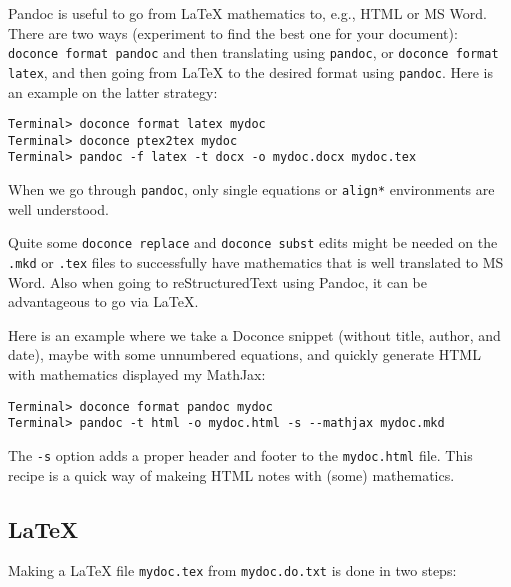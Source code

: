 \documentclass[%
oneside,                 %
final,                   %
10pt]{article}
\begin{document}
{{{{Pandoc is useful to go from {\LaTeX} mathematics to, e.g., HTML or MS Word.
There are two ways (experiment to find the best one for your document):
{\fontsize{10pt}{10pt}\Verb!doconce format pandoc!} and then translating using {\fontsize{10pt}{10pt}\Verb!pandoc!}, or
{\fontsize{10pt}{10pt}\Verb!doconce format latex!}, and then going from {\LaTeX} to the desired format
using {\fontsize{10pt}{10pt}\Verb!pandoc!}.
Here is an example on the latter strategy:
\vspace{4pt}
\begin{Verbatim}[numbers=none,frame=lines,label=\fbox{{\tiny Terminal}},fontsize=\fontsize{9pt}{9pt},
labelposition=topline,framesep=2.5mm,framerule=0.7pt]
Terminal> doconce format latex mydoc
Terminal> doconce ptex2tex mydoc
Terminal> pandoc -f latex -t docx -o mydoc.docx mydoc.tex
\end{Verbatim}
When we go through {\fontsize{10pt}{10pt}\Verb!pandoc!}, only single equations or {\fontsize{10pt}{10pt}\Verb!align*!}
environments are well understood.

Quite some {\fontsize{10pt}{10pt}\Verb!doconce replace!} and {\fontsize{10pt}{10pt}\Verb!doconce subst!} edits might be needed
on the {\fontsize{10pt}{10pt}\Verb!.mkd!} or {\fontsize{10pt}{10pt}\Verb!.tex!} files to successfully have mathematics that is
well translated to MS Word.  Also when going to reStructuredText using
Pandoc, it can be advantageous to go via {\LaTeX}.

Here is an example where we take a Doconce snippet (without title, author,
and date), maybe with some unnumbered equations, and quickly generate
HTML with mathematics displayed my MathJax:
\vspace{4pt}
\begin{Verbatim}[numbers=none,frame=lines,label=\fbox{{\tiny Terminal}},fontsize=\fontsize{9pt}{9pt},
labelposition=topline,framesep=2.5mm,framerule=0.7pt]
Terminal> doconce format pandoc mydoc
Terminal> pandoc -t html -o mydoc.html -s --mathjax mydoc.mkd
\end{Verbatim}
The {\fontsize{10pt}{10pt}\Verb!-s!} option adds a proper header and footer to the {\fontsize{10pt}{10pt}\Verb!mydoc.html!} file.
This recipe is a quick way of makeing HTML notes with (some) mathematics.

\subsection{{\LaTeX}}

Making a {\LaTeX} file {\fontsize{10pt}{10pt}\Verb!mydoc.tex!} from {\fontsize{10pt}{10pt}\Verb!mydoc.do.txt!} is done in two steps:

}}}}
\end{document}
